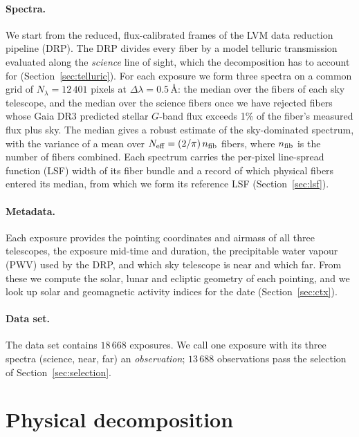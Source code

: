 \paragraph{Spectra.} We start from the reduced, flux-calibrated frames of the
LVM data reduction pipeline (DRP). The DRP divides every fiber by a model
telluric transmission evaluated along the \emph{science} line of sight, which
the decomposition has to account for (Section~\ref{sec:telluric}). For each
exposure we form three spectra on a common grid of $N_\lambda = 12\,401$
pixels at $\Delta\lambda = 0.5$\,\AA: the median over the fibers of each sky
telescope, and the median over the science fibers once we have rejected
fibers whose Gaia DR3 \citep{GaiaDR3} predicted stellar $G$-band flux exceeds
1\% of the fiber's measured flux plus sky. The median gives a robust estimate
of the sky-dominated spectrum, with the variance of a mean over
$N_{\rm eff} = (2/\pi)\,n_{\rm fib}$ fibers, where $n_{\rm fib}$ is the
number of fibers combined. Each spectrum carries the per-pixel line-spread
function (LSF) width of its fiber bundle and a record of which physical fibers
entered its median, from which we form its reference LSF
(Section~\ref{sec:lsf}).

\paragraph{Metadata.} Each exposure provides the pointing coordinates and
airmass of all three telescopes, the exposure mid-time and duration, the
precipitable water vapour (PWV) used by the DRP, and which sky telescope is
near and which far. From these we compute the solar, lunar and ecliptic
geometry of each pointing, and we look up solar and geomagnetic activity
indices for the date (Section~\ref{sec:ctx}).

\paragraph{Data set.} The data set contains $18\,668$ exposures. We call one
exposure with its three spectra (science, near, far) an \emph{observation};
$13\,688$ observations pass the selection of Section~\ref{sec:selection}.

\section{Physical decomposition}
\label{sec:decomp}

